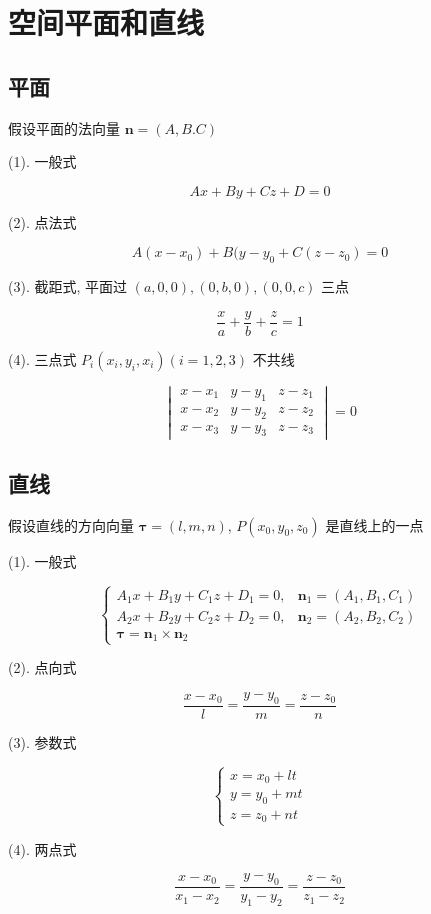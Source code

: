 \section{空间平面和直线}

\subsection{平面}

\begin{definition}[平面方程]
	
	假设平面的法向量 $\boldsymbol{n} = (A, B. C)$

	(1). 一般式
	
	$$Ax+By+Cz+D=0$$

	
	(2). 点法式
	
	$$A(x-x_{0})+B(y-y_{0}+C(z-z_{0})=0$$
	
	(3). 截距式, 平面过 $(a,0,0), (0,b,0), (0,0,c)$ 三点
	
	$$\dfrac{x}{a}+\dfrac{y}{b}+\dfrac{z}{c}=1$$	
	
	(4). 三点式 $P_{i} (x_{i}, y_{i}, x_{i})(i = 1,2,3)$ 不共线  
	
	$$\begin{vmatrix}
		x-x_{1} & y-y_{1} & z-z_{1}\\
		x-x_{2} & y-y_{2} & z-z_{2}\\
		x-x_{3} & y-y_{3} & z-z_{3}
	\end{vmatrix} = 0$$
\end{definition}

\subsection{直线}

\begin{definition}[直线方程]
	
	假设直线的方向向量 $\boldsymbol{\tau} = (l,m,n)$, $P(x_{0},y_{0},z_{0})$ 是直线上的一点

	(1). 一般式
	
	$$\begin{cases}
		A_{1}x+B_{1}y+C_{1}z + D_{1}= 0, & \boldsymbol{n}_{1}=(A_{1},B_{1},C_{1})\\
		A_{2}x+B_{2}y+C_{2}z + D_{2}= 0, & \boldsymbol{n}_{2}=(A_{2},B_{2},C_{2})\\
		\boldsymbol{\tau} = \boldsymbol{n}_{1}\times \boldsymbol{n}_{2} 
	\end{cases}$$
	
	(2). 点向式
	
	$$\dfrac{x-x_{0}}{l}=\dfrac{y-y_{0}}{m}=\dfrac{z-z_{0}}{n}$$
	
	(3). 参数式
	
	$$\begin{cases}
		x = x_{0} + lt\\
		y = y_{0} + mt\\
		z = z_{0} + nt
	\end{cases}$$
	
	(4). 两点式
	
	$$\dfrac{x-x_{0}}{x_{1}-x_{2}}=\dfrac{y-y_{0}}{y_{1}-y_{2}}=\dfrac{z-z_{0}}{z_{1}-z_{2}}$$
\end{definition}

